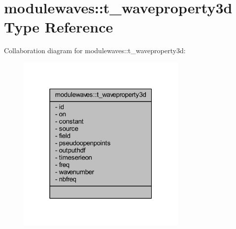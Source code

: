 \hypertarget{structmodulewaves_1_1t__waveproperty3d}{}\section{modulewaves\+:\+:t\+\_\+waveproperty3d Type Reference}
\label{structmodulewaves_1_1t__waveproperty3d}


Collaboration diagram for modulewaves\+:\+:t\+\_\+waveproperty3d\+:\nopagebreak
\begin{figure}[H]
\begin{center}
\leavevmode
\includegraphics[width=235pt]{structmodulewaves_1_1t__waveproperty3d__coll__graph}
\end{center}
\end{figure}
